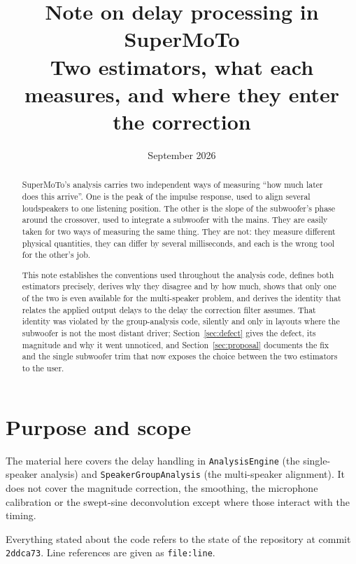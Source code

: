 \documentclass[11pt,a4paper]{article}
\title{\bfseries Note on delay processing in SuperMoTo\\
       \large Two estimators, what each measures, and where they enter the correction}
\author{}
\date{September 2026}
\newcommand{\srcref}[2]{\texttt{\small #1}\discretionary{}{}{}\texttt{\small :#2}}
\newcommand{\code}[1]{\texttt{\small #1}}
\begin{document}
\maketitle
\thispagestyle{fancy}

\begin{abstract}
\noindent
SuperMoTo's analysis carries two independent ways of measuring ``how much later
does this arrive''. One is the peak of the impulse response, used to align
several loudspeakers to one listening position. The other is the slope of the
subwoofer's phase around the crossover, used to integrate a subwoofer with the
mains. They are easily taken for two ways of measuring the same thing. They
are not: they measure different physical quantities, they can
differ by several milliseconds, and each is the wrong tool for the other's job.

This note establishes the conventions used throughout the analysis code, defines
both estimators precisely, derives why they disagree and by how much, shows that
only one of the two is even available for the multi-speaker problem, and derives
the identity that relates the applied output delays to the delay the correction
filter assumes. That identity was violated by the group-analysis code, silently
and only in layouts where the subwoofer is not the most distant driver;
Section~\ref{sec:defect} gives the defect, its magnitude and why it went
unnoticed, and Section~\ref{sec:proposal} documents the fix and the single
subwoofer trim that now exposes the choice between the two estimators to the
user.
\end{abstract}

\tableofcontents

\section{Purpose and scope}

The material here covers the delay handling in \code{AnalysisEngine} (the
single-speaker analysis) and \code{SpeakerGroupAnalysis} (the multi-speaker
alignment). It does not cover the magnitude correction, the smoothing, the
microphone calibration or the swept-sine deconvolution except where those
interact with the timing.

Everything stated about the code refers to the state of the repository at commit
\code{2ddca73}. Line references are given as \srcref{file}{line}.

\end{document}
